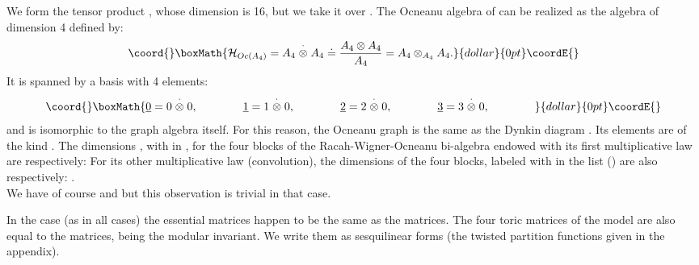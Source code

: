 \documentclass[a4paper,11pt]{article}
\def \otimesdot {\stackrel{\cdot}{\otimes}}
\providecommand{\ud}[1]{\underline{#1}}
\begin{document}
\normalsize

We form the tensor product \coordHE{}, whose dimension is 16, but
we take it over \coordHE{}. The Ocneanu algebra
of \coordHE{}  can be realized as the algebra of dimension 4 defined by:
$$\coord{}\boxMath{
{\cal H}_{Oc(A_4)} = A_4 \otimesdot A_4 \doteq
\frac{A_4 \otimes A_4 }{A_4} = A_4 \otimes_{A_4} A_4.
}{dollar}{0pt}\coordE{}$$
It is spanned by a basis with 4 elements:
$$\coord{}\boxMath{
\ud0 = 0 \otimesdot 0, \qquad \qquad  \ud1 = 1 \otimesdot 0, \qquad \qquad
\ud2 = 2 \otimesdot 0, \qquad \qquad  \ud3 = 3 \otimesdot 0, \qquad \qquad
}{dollar}{0pt}\coordE{}$$
and is isomorphic to the graph algebra \coordHE{} itself.
For this reason, the Ocneanu graph \coordHE{} is the same as
the Dynkin diagram \coordHE{}.
Its elements are of the kind \myHighlight{$m \otimesdot n = 0 \otimesdot mn = mn
\otimesdot 0$}\coordHE{}.
The dimensions \coordHE{}, with \coordHE{} in \coordHE{},
for the four blocks of the Racah-Wigner-Ocneanu bi-algebra \coordHE{}
endowed with its first multiplicative law are respectively:
\coordHE{}
For its other multiplicative law (convolution), the dimensions \coordHE{}
of the four blocks, labeled with \coordHE{} in the list (\myHighlight{$0 \otimesdot 0, 1
\otimesdot 0, 2 \otimesdot 0, 3 \otimesdot 0$}\coordHE{}) are also respectively:
\coordHE{}.\\
We have of course \coordHE{} and \coordHE{} but this observation is trivial in that case.

In the \coordHE{} case (as in all \coordHE{} cases) the essential matrices
\coordHE{} happen to be the same as
the \coordHE{} matrices.
The four toric matrices \coordHE{} of the \coordHE{} model are also equal
to the \coordHE{} matrices, \coordHE{} being the  modular invariant.
We write them as sesquilinear forms (the twisted partition functions
given in the appendix).
\end{document}
